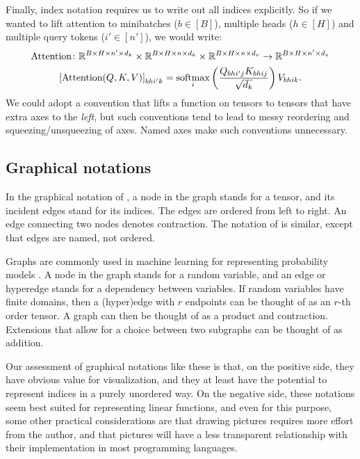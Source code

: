 Finally, index notation requires us to write out all indices explicitly. So if we wanted to lift attention to minibatches ($b \in [B]$), multiple heads ($h \in [H]$) and multiple query tokens ($i' \in [n']$), we would write:
\begin{gather*}
  \text{Attention} \colon \mathbb{R}^{B \times H \times n' \times d_k} \times \mathbb{R}^{B \times H \times n \times d_k} \times \mathbb{R}^{B \times H \times n \times d_v} \rightarrow \mathbb{R}^{B \times H \times n' \times d_v} \\
  \left[\text{Attention}(Q, K, V)\right]_{bhi'k} = \operatorname*{softmax}_i \left( \frac{Q_{bhi'j} K_{bhij}}{\sqrt{d_k}} \right) V_{bhik}.
\end{gather*}
We could adopt a convention that lifts a function on tensors to tensors that have extra axes to the \emph{left}, but such conventions tend to lead to messy reordering and squeezing/unsqueezing of axes. Named axes make such conventions unnecessary.

\subsection{Graphical notations}

In the graphical notation of \citet{penrose:1971}, a node in the graph stands for a tensor, and its incident edges stand for its indices. The edges are ordered from left to right. An edge connecting two nodes denotes contraction. The notation of \citet{alsberg:1997} is similar, except that edges are named, not ordered.

Graphs are commonly used in machine learning for representing probability models \citep{koller+friedman:2009}. A node in the graph stands for a random variable, and an edge or hyperedge stands for a dependency between variables. If random variables have finite domains, then a (hyper)edge with $r$ endpoints can be thought of as an $r$-th order tensor. A graph can then be thought of as a product and contraction. Extensions that allow for a choice between two subgraphs \citep[e.g.,][]{minka+winn:2008} can be thought of as addition.

Our assessment of graphical notations like these is that, on the positive side, they have obvious value for visualization, and they at least have the potential to represent indices in a purely unordered way. On the negative side, these notations seem best suited for representing linear functions, and even for this purpose, some other practical considerations are that drawing pictures requires more effort from the author, and that pictures will have a less transparent relationship with their implementation in most programming languages.


